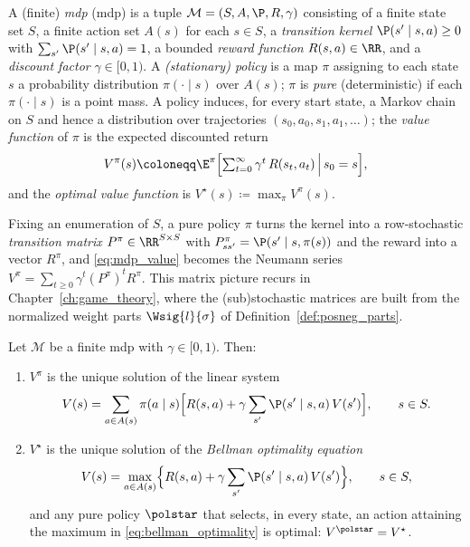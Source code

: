 \begin{definition}\label{def:mdp}
A (finite) \emph{\acl{mdp}} (\acs{mdp}) \parencite{Puterman1994mdp,SuttonBarto2018rl} is a tuple $\mathcal{M} = (S, A, \P, R, \gamma)$ consisting of a finite state set $S$, a finite action set $A(s)$ for each $s \in S$, a \emph{transition kernel} $\P(s' \mid s, a) \ge 0$ with $\sum_{s'} \P(s' \mid s, a) = 1$, a bounded \emph{reward function} $R(s, a) \in \RR$, and a \emph{discount factor} $\gamma \in [0, 1)$. A \emph{(stationary) policy} is a map $\pi$ assigning to each state $s$ a probability distribution $\pi(\cdot \mid s)$ over $A(s)$; $\pi$ is \emph{pure} (deterministic) if each $\pi(\cdot \mid s)$ is a point mass. A policy induces, for every start state, a Markov chain on $S$ and hence a distribution over trajectories $(s_0, a_0, s_1, a_1, \ldots)$; the \emph{value function} of $\pi$ is the expected discounted return
\begin{equation}
	V^{\pi}(s) \coloneqq \E^{\pi}\Bigl[ \textstyle\sum_{t=0}^{\infty} \gamma^{t}\, R(s_t, a_t) \,\Big|\, s_0 = s \Bigr],
	\label{eq:mdp_value}
\end{equation}
and the \emph{optimal value function} is $V^{\star}(s) \coloneqq \max_{\pi} V^{\pi}(s)$.
\end{definition}

Fixing an enumeration of $S$, a pure policy $\pi$ turns the kernel into a row-stochastic \emph{transition matrix} $P^{\pi} \in \RR^{S \times S}$ with $P^{\pi}_{s s'} = \P(s' \mid s, \pi(s))$ and the reward into a vector $R^{\pi}$, and \eqref{eq:mdp_value} becomes the Neumann series $V^{\pi} = \sum_{t \ge 0} \gamma^t (P^{\pi})^t R^{\pi}$. This matrix picture recurs in Chapter~\ref{ch:game_theory}, where the (sub)stochastic matrices are built from the normalized weight parts $\Wsig{l}{\sigma}$ of Definition~\ref{def:posneg_parts}.

\begin{proposition}\label{prop:bellman}
Let $\mathcal{M}$ be a finite \ac{mdp} with $\gamma \in [0,1)$. Then:
\begin{enumerate}
	\item $V^{\pi}$ is the unique solution of the linear system
	\begin{equation}
		V(s) = \sum_{a \in A(s)} \pi(a \mid s) \Bigl[ R(s,a) + \gamma \sum_{s'} \P(s' \mid s, a)\, V(s') \Bigr],
		\qquad s \in S.
		\label{eq:bellman_evaluation}
	\end{equation}
	\item $V^{\star}$ is the unique solution of the \emph{Bellman optimality equation}
	\begin{equation}
		V(s) = \max_{a \in A(s)} \Bigl\{ R(s, a) + \gamma \sum_{s'} \P(s' \mid s, a)\, V(s') \Bigr\},
		\qquad s \in S,
		\label{eq:bellman_optimality}
	\end{equation}
	and any pure policy $\polstar$ that selects, in every state, an action attaining the maximum in \eqref{eq:bellman_optimality} is optimal: $V^{\polstar} = V^{\star}$.
\end{enumerate}
\hfill{}
\end{proposition}

